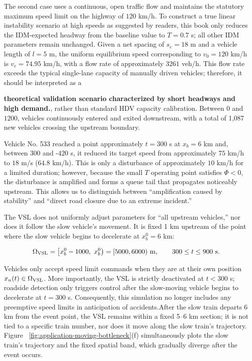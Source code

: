 \documentclass[11pt,a4paper,openany]{book}
\numberwithin{equation}{chapter}
\numberwithin{figure}{chapter}
\numberwithin{table}{chapter}
\begin{document}
The second case uses a continuous, open traffic flow and maintains the statutory maximum speed limit on the highway of $120$ km/h. To construct a true linear instability scenario at high speeds as suggested by readers, this book only reduces the IDM-expected headway from the baseline value to $T=0.7$ s; all other IDM parameters remain unchanged. Given a net spacing of $s_e=18$ m and a vehicle length of $l=5$ m, the uniform equilibrium speed corresponding to $v_0=120$ km/h is $v_e=74.95$ km/h, with a flow rate of approximately $3261$ veh/h. This flow rate exceeds the typical single-lane capacity of manually driven vehicles; therefore, it should be interpreted as a




\textbf{theoretical validation scenario characterized by short headways and high demand.}, rather than standard HDV capacity calibration. Between $0$ and $1200$, vehicles continuously entered and exited downstream, with a total of 1,087 new vehicles crossing the upstream boundary.




Vehicle No. 533 reached a point approximately $t=300$ s at $x_b=6$ km and, between $300$ and -$420$ s, it reduced its target speed from approximately $75$ km/h to $18$ m/s ($64.8$ km/h). This is only a disturbance of approximately $10$ km/h for a limited duration; however, because the small $T$ operating point satisfies $\Phi<0$, the disturbance is amplified and forms a queue tail that propagates noticeably upstream. This allows us to distinguish between “amplification caused by stability” and “direct road closure due to an extreme incident.”




The VSL does not uniformly adjust parameters for “all upstream vehicles,” nor does it follow the slow vehicle’s movement. It is fixed 1 km upstream of the point where the slow vehicle begins to decelerate at $x_b^0=6$ km:

\begin{equation}
\Omega_{\rm VSL}=\bigl[x_b^0-1000,\ x_b^0\bigr)
= [5000,6000)~{\rm m},
\qquad 300\le t\le900~{\rm s}.
\label{eq:vsl-fixed-zone}
\end{equation}

Vehicles only accept speed limit commands when they are at their own position $x_n(t)\in\Omega_{\rm VSL}$. More importantly, the VSL is strictly deactivated at $t<300$ s; roadside detection only triggers control after the slow-moving vehicle begins to decelerate at $t=300$ s. Consequently, this simulation no longer includes any preemptive speed limits in anticipation of accidents.After the slow train departs 6 km from the event point, the VSL remains within a fixed 5–6 km section; it is not tied to a specific train number, nor does it move along the slow train’s trajectory. Figure ~\ref{fig:application-moving-bottleneck}(f) simultaneously plots the slow train’s trajectory and the fixed spatial band, which gradually diverge after the event occurs.
\end{document}

